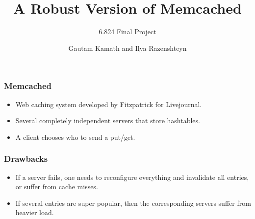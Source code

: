 \documentclass{beamer}
\title{A Robust Version of Memcached}
\subtitle{6.824 Final Project}
\author{Gautam Kamath and Ilya Razenshteyn}
\institute{MIT}
\begin{document}
    \begin{frame}
      \titlepage
    \end{frame}
    \begin{frame}
        \frametitle{Memcached}
        \begin{itemize}
            \item Web caching system developed by Fitzpatrick for Livejournal.
            \item Several completely independent servers that store hashtables.
            \item A client chooses who to send a put/get.
        \end{itemize}
    \end{frame}
    \begin{frame}
        \frametitle{Drawbacks}
        \begin{itemize}
            \item If a server fails, one needs to reconfigure everything and invalidate
            all entries, or suffer from cache misses.
            \item If several entries are super popular, then the corresponding servers
            suffer from heavier load.
        \end{itemize}
    \end{frame}
\end{document}
